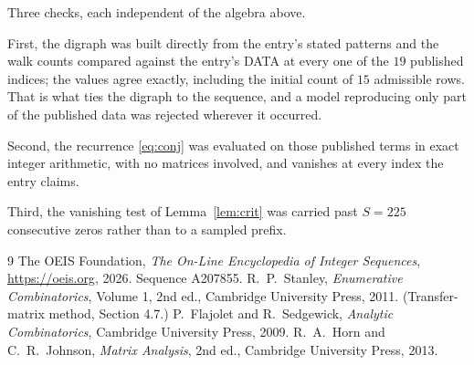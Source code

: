 \documentclass[11pt,a4paper]{article}
\theoremstyle{plain}
\theoremstyle{definition}
\begin{document}
Three checks, each independent of the algebra above.

First, the digraph was built directly from the entry's stated patterns and the walk counts
compared against the entry's DATA at every one of the $19$ published indices; the
values agree exactly, including the initial count of $15$ admissible rows. That is
what ties the digraph to the sequence, and a model reproducing only part of the published
data was rejected wherever it occurred.

Second, the recurrence \eqref{eq:conj} was evaluated on those published terms in exact
integer arithmetic, with no matrices involved, and vanishes at every index the entry claims.

Third, the vanishing test of Lemma~\ref{lem:crit} was carried past $S=225$ consecutive
zeros rather than to a sampled prefix.

\begin{thebibliography}{9}
 The OEIS Foundation, \emph{The On-Line Encyclopedia of Integer
Sequences}, \url{https://oeis.org}, 2026. Sequence A207855.
 R.~P.~Stanley, \emph{Enumerative Combinatorics}, Volume 1, 2nd ed.,
Cambridge University Press, 2011. (Transfer-matrix method, Section 4.7.)
 P.~Flajolet and R.~Sedgewick, \emph{Analytic Combinatorics}, Cambridge
University Press, 2009.
 R.~A.~Horn and C.~R.~Johnson, \emph{Matrix Analysis}, 2nd ed., Cambridge
University Press, 2013.
\end{thebibliography}
\end{document}
